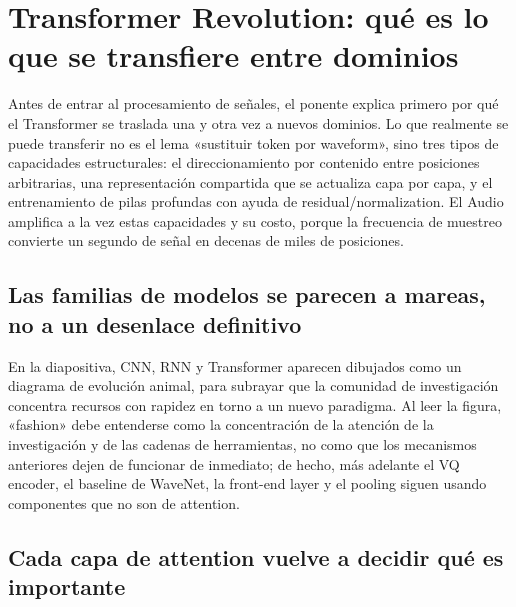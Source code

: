 \section{Transformer Revolution: qué es lo que se transfiere entre dominios}

Antes de entrar al procesamiento de señales, el ponente explica primero por qué el Transformer se traslada una y otra vez a nuevos dominios. Lo que realmente se puede transferir no es el lema «sustituir token por waveform», sino tres tipos de capacidades estructurales: el direccionamiento por contenido entre posiciones arbitrarias, una representación compartida que se actualiza capa por capa, y el entrenamiento de pilas profundas con ayuda de residual/normalization. El Audio amplifica a la vez estas capacidades y su costo, porque la frecuencia de muestreo convierte un segundo de señal en decenas de miles de posiciones.

\subsection{Las familias de modelos se parecen a mareas, no a un desenlace definitivo}

En la diapositiva, CNN, RNN y Transformer aparecen dibujados como un diagrama de evolución animal, para subrayar que la comunidad de investigación concentra recursos con rapidez en torno a un nuevo paradigma. Al leer la figura, «fashion» debe entenderse como la concentración de la atención de la investigación y de las cadenas de herramientas, no como que los mecanismos anteriores dejen de funcionar de inmediato; de hecho, más adelante el VQ encoder, el baseline de WaveNet, la front-end layer y el pooling siguen usando componentes que no son de attention.



\subsection{Cada capa de attention vuelve a decidir qué es importante}

